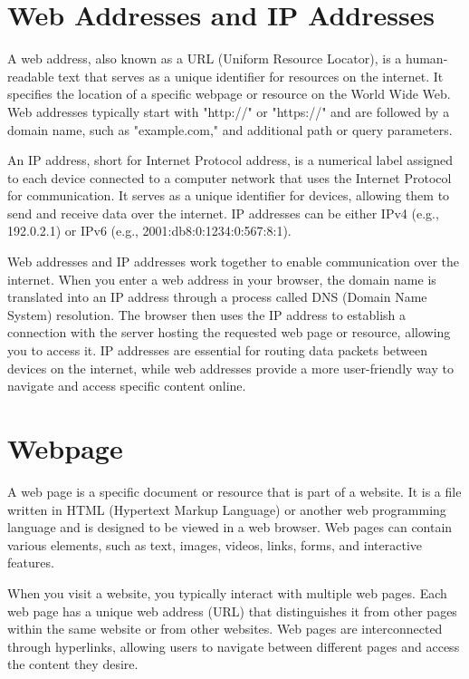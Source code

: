 \documentclass[a4paper,11pt]{scrarticle}
\begin{document}
\section{Web Addresses and IP Addresses}
A web address, also known as a URL (Uniform Resource Locator), is a human-readable text that serves as a unique identifier for resources on the internet. It specifies the location of a specific webpage or resource on the World Wide Web. Web addresses typically start with "http://" or "https://" and are followed by a domain name, such as "example.com," and additional path or query parameters.

An IP address, short for Internet Protocol address, is a numerical label assigned to each device connected to a computer network that uses the Internet Protocol for communication. It serves as a unique identifier for devices, allowing them to send and receive data over the internet. IP addresses can be either IPv4 (e.g., 192.0.2.1) or IPv6 (e.g., 2001:db8:0:1234:0:567:8:1).

Web addresses and IP addresses work together to enable communication over the internet. When you enter a web address in your browser, the domain name is translated into an IP address through a process called DNS (Domain Name System) resolution. The browser then uses the IP address to establish a connection with the server hosting the requested web page or resource, allowing you to access it. IP addresses are essential for routing data packets between devices on the internet, while web addresses provide a more user-friendly way to navigate and access specific content online.


\section{Webpage}
A web page is a specific document or resource that is part of a website. It is a file written in HTML (Hypertext Markup Language) or another web programming language and is designed to be viewed in a web browser. Web pages can contain various elements, such as text, images, videos, links, forms, and interactive features.

When you visit a website, you typically interact with multiple web pages. Each web page has a unique web address (URL) that distinguishes it from other pages within the same website or from other websites. Web pages are interconnected through hyperlinks, allowing users to navigate between different pages and access the content they desire.
\end{document}
